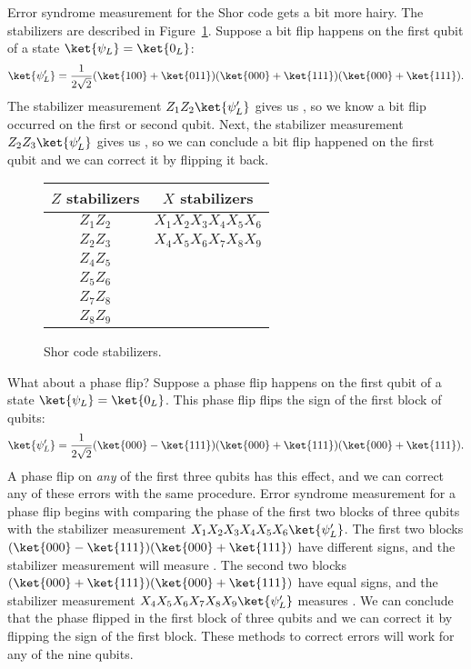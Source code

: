 Error syndrome measurement for the Shor code gets a bit more hairy. The stabilizers are described in Figure~\ref{fig:shor_stabilizers}. Suppose a bit flip happens on the first qubit of a state $\ket{\psi_L} = \ket{0_L}$:
\begin{equation}
  \ket{\psi_L'} = \dfrac{1}{2\sqrt 2}(\ket{100} + \ket{011})(\ket{000} + \ket{111})(\ket{000} + \ket{111}).
\end{equation}
The stabilizer measurement $Z_1Z_2\ket{\psi_L'}$ gives us , so we know a bit flip occurred on the first or second qubit. Next, the stabilizer measurement $Z_2Z_3\ket{\psi_L'}$ gives us , so we can conclude a bit flip happened on the first qubit and we can correct it by flipping it back.
\begin{figure}[ht]
  \centering
  \begin{tabular}{c|c}
    $Z$ stabilizers & $X$ stabilizers \\ \hline
    $Z_1Z_2$ & $X_1X_2X_3X_4X_5X_6$ \\
    $Z_2Z_3$ & $X_4X_5X_6X_7X_8X_9$ \\
    $Z_4Z_5$ &  \\
    $Z_5Z_6$ &  \\
    $Z_7Z_8$ &  \\
    $Z_8Z_9$ &  \\
  \end{tabular}
  \caption{Shor code stabilizers.}
  \label{fig:shor_stabilizers}
\end{figure}

What about a phase flip? Suppose a phase flip happens on the first qubit of a state $\ket{\psi_L} = \ket{0_L}$. This phase flip flips the sign of the first block of qubits:
\begin{equation}
  \ket{\psi_L'} = \dfrac{1}{2\sqrt 2}(\ket{000} - \ket{111})(\ket{000} + \ket{111})(\ket{000} + \ket{111}).
\end{equation}
A phase flip on \emph{any} of the first three qubits has this effect, and we can correct any of these errors with the same procedure. Error syndrome measurement for a phase flip begins with comparing the phase of the first two blocks of three qubits with the stabilizer measurement $X_1X_2X_3X_4X_5X_6\ket{\psi_L'}$. The first two blocks $(\ket{000} - \ket{111})(\ket{000} + \ket{111})$ have different signs, and the stabilizer measurement will measure . The second two blocks $(\ket{000} + \ket{111})(\ket{000} + \ket{111})$ have equal signs, and the stabilizer measurement $X_4X_5X_6X_7X_8X_9\ket{\psi_L'}$ measures . We can conclude that the phase flipped in the first block of three qubits and we can correct it by flipping the sign of the first block. These methods to correct errors will work for any of the nine qubits.

